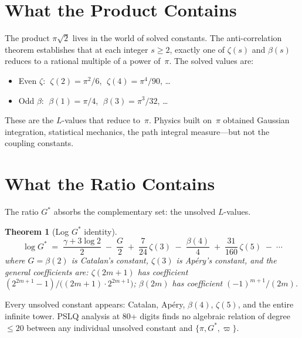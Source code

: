\documentclass[12pt,reqno]{amsart}
\newtheorem{theorem}{Theorem}[section]
\theoremstyle{definition}
\theoremstyle{remark}
\newcommand{\Gstar}{G^{\!*}}
\begin{document}
\section{What the Product Contains}

The product $\pi\sqrt{2}$ lives in the world of solved constants.
The anti-correlation theorem \cite{Anon2026a} establishes that at each integer
$s\geq 2$, exactly one of $\zeta(s)$ and $\beta(s)$ reduces to a rational multiple
of a power of~$\pi$. The solved values are:
\begin{itemize}[nosep]
  \item Even $\zeta$: $\;\zeta(2)=\pi^2/6$, $\;\zeta(4)=\pi^4/90$, \ldots
  \item Odd $\beta$: $\;\beta(1)=\pi/4$, $\;\beta(3)=\pi^3/32$, \ldots
\end{itemize}
These are the $L$-values that reduce to~$\pi$. Physics built on~$\pi$ obtained Gaussian
integration, statistical mechanics, the path integral measure---but not the coupling
constants.

\section{What the Ratio Contains}

The ratio $\Gstar$ absorbs the complementary set: the unsolved $L$-values.

\begin{theorem}[Log $\Gstar$ identity]\label{thm:loggstar}
\begin{equation}\label{eq:loggstar}
  \log\Gstar \;=\; \frac{\gamma+3\log 2}{2}
  \;-\;\frac{G}{2}
  \;+\;\frac{7}{24}\,\zeta(3)
  \;-\;\frac{\beta(4)}{4}
  \;+\;\frac{31}{160}\,\zeta(5)
  \;-\;\cdots
\end{equation}
where $G=\beta(2)$ is Catalan's constant, $\zeta(3)$ is Ap\'ery's constant, and the
general coefficients are: $\zeta(2m+1)$ has coefficient
$(2^{2m+1}-1)/\bigl((2m+1)\cdot 2^{2m+1}\bigr)$; $\beta(2m)$ has coefficient
$(-1)^{m+1}/(2m)$.
\end{theorem}

Every unsolved constant appears: Catalan, Ap\'ery, $\beta(4)$, $\zeta(5)$, and the
entire infinite tower. PSLQ analysis at 80+ digits finds no algebraic relation of
degree~$\leq 20$ between any individual unsolved constant and
$\{\pi,\Gstar,\varpi\}$.
\end{document}
